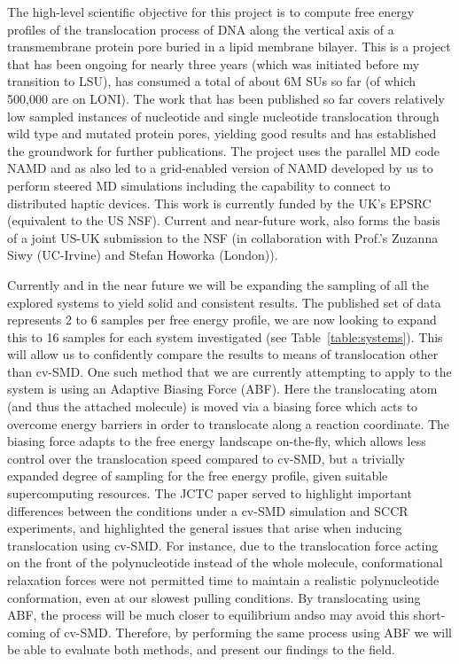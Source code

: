 \documentclass[a4paper,10pt]{article}
\begin{document}
The high-level scientific objective for this project is to compute
free energy profiles of the translocation process of DNA along the
vertical axis of a transmembrane protein pore buried in a lipid
membrane bilayer. This is a project that has been ongoing for nearly
three years (which was initiated before my transition to LSU), has
consumed a total of about 6M SUs so far (of which 500,000 are on
LONI). The work that has been published so far covers relatively low
sampled instances of nucleotide and single nucleotide translocation
through wild type and mutated protein pores, yielding good results and
has established the groundwork for further publications. The project
uses the parallel MD code NAMD and as also led to a grid-enabled
version of NAMD developed by us to perform steered MD simulations
including the capability to connect to distributed haptic
devices. This work is currently funded by the UK's EPSRC (equivalent
to the US NSF). Current and near-future work, also forms the basis of
a joint US-UK submission to the NSF (in collaboration with Prof.'s
Zuzanna Siwy (UC-Irvine) and Stefan Howorka (London)).

Currently and in the near future we will be expanding the sampling of
all the explored systems to yield solid and consistent results. The
published set of data represents 2 to 6 samples per free energy
profile, we are now looking to expand this to 16 samples for each
system investigated (see Table~\ref{table:systems}). This will allow
us to confidently compare the results to means of translocation other
than cv-SMD. One such method that we are currently attempting to apply
to the system is using an Adaptive Biasing Force (ABF). Here the
translocating atom (and thus the attached molecule) is moved via a
biasing force which acts to overcome energy barriers in order to
translocate along a reaction coordinate. The biasing force adapts to
the free energy landscape on-the-fly, which allows less control over
the translocation speed compared to cv-SMD, but a trivially expanded
degree of sampling for the free energy profile, given suitable
supercomputing resources. The JCTC paper served to highlight important
differences between the conditions under a cv-SMD simulation and SCCR
experiments, and highlighted the general issues that arise when
inducing translocation using cv-SMD. For instance, due to the
translocation force acting on the front of the polynucleotide instead
of the whole molecule, conformational relaxation forces were not
permitted time to maintain a realistic polynucleotide conformation,
even at our slowest pulling conditions. By translocating using ABF,
the process will be much closer to equilibrium andso may avoid this
short-coming of cv-SMD. Therefore, by performing the same process
using ABF we will be able to evaluate both methods, and present our
findings to the field.
\end{document}
